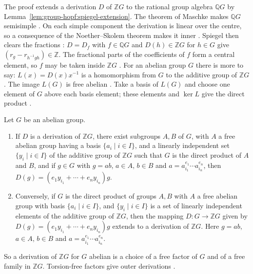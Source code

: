 The proof extends a derivation $D$ of $\mathbb{Z}G$ to the rational group algebra
$\mathbb{Q}G$ by Lemma~\ref{lem:group-hopf:spiegel-extension}. The theorem of
Maschke makes $\mathbb{Q}G$ semisimple \cite[p.~2956]{Spiegel1994}. On each simple component
the derivation is linear over the centre, so a consequence of the Noether--Skolem
theorem makes it inner \cite[pp.~2956--2957]{Spiegel1994}. Spiegel then clears
the fractions \cite[pp.~2957--2958]{Spiegel1994}: $D= D_f$ with $f\in\mathbb{Q}G$
and $D(h)\in\mathbb{Z}G$ for $h\in G$ give $(r_g-r_{h^{-1}gh})\in\mathbb{Z}$.
The fractional parts of the coefficients of $f$ form a central element, so $f$
may be taken inside $\mathbb{Z}G$ \cite[pp.~2957--2958]{Spiegel1994}. For an
abelian group $G$ there is more to say: $L(x)=D(x)x^{-1}$ is a homomorphism from
$G$ to the additive group of $\mathbb{Z}G$ \cite[p.~2958]{Spiegel1994}. The
image $L(G)$ is free abelian \cite[p.~2958]{Spiegel1994}. Take a basis of $L(G)$
and choose one element of $G$ above each basis element; these elements and
$\ker L$ give the direct product \cite[p.~2958]{Spiegel1994}.

\begin{theorem}\label{thm:group-hopf:spiegel-abelian}
Let $G$ be an abelian group.
\begin{enumerate}
\item If $D$ is a derivation of $\mathbb{Z}G$, there exist subgroups $A,B$ of $G$,
with $A$ a free abelian group having a basis $\{a_i\mid i\in I\}$, and a linearly
independent set $\{y_i\mid i\in I\}$ of the additive group of $\mathbb{Z}G$ such
that $G$ is the direct product of $A$ and $B$, and if $g\in G$ with $g=ab$, $a\in A$,
$b\in B$ and $a=a_{i_1}^{e_1}\cdots a_{i_n}^{e_n}$, then
$D(g)=(e_1 y_{i_1}+\cdots+e_n y_{i_n})g$.
\item Conversely, if $G$ is the direct product of groups $A,B$ with $A$ a free
abelian group with basis $\{a_i\mid i\in I\}$, and $\{y_i\mid i\in I\}$ is a set of
linearly independent elements of the additive group of $\mathbb{Z}G$, then the
mapping $D\colon G\to\mathbb{Z}G$ given by
$D(g)=(e_1 y_{i_1}+\cdots+e_n y_{i_n})g$ extends to a derivation of $\mathbb{Z}G$.
Here $g=ab$, $a\in A$, $b\in B$ and $a=a_{i_1}^{e_1}\cdots a_{i_n}^{e_n}$.
\end{enumerate}
\end{theorem}

So a derivation of $\mathbb{Z}G$ for $G$ abelian is a choice of a free factor of $G$
and of a free family in $\mathbb{Z}G$. Torsion-free factors give outer derivations
\cite[Theorem~2, pp.~2958--2959]{Spiegel1994}.

